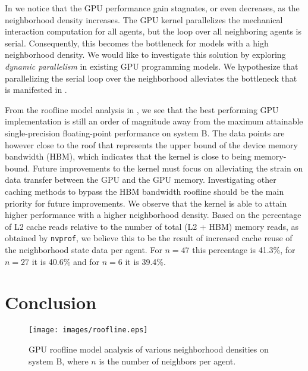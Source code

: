 \documentclass[conference]{IEEEtran}
\begin{document}
\par In  we notice that the GPU performance gain stagnates, or even decreases, as the neighborhood density increases.
The GPU kernel parallelizes the mechanical interaction computation for all agents, but the loop over all neighboring agents is serial.
Consequently, this becomes the bottleneck for models with a high neighborhood density.
We would like to investigate this solution by exploring \textit{dynamic parallelism} \cite{jones2012introduction} in existing GPU programming models.
We hypothesize that parallelizing the serial loop over the neighborhood alleviates the bottleneck that is manifested in .
\par From the roofline model analysis in , we see that the best performing GPU implementation is still an order of magnitude away from the maximum attainable single-precision floating-point performance on system B.
The data points are however close to the roof that represents the upper bound of the device memory bandwidth (HBM), which indicates that the kernel is close to being memory-bound.
Future improvements to the kernel must focus on alleviating the strain on data transfer between the GPU and the GPU memory.
Investigating other caching methods to bypass the HBM bandwidth roofline should be the main priority for future improvements.
We observe that the kernel is able to attain higher performance with a higher neighborhood density.
Based on the percentage of L2 cache reads relative to the number of total (L2 + HBM) memory reads, as obtained by \texttt{nvprof}, we believe this to be the result of increased cache reuse of the neighborhood state data per agent.
For $n = 47$ this percentage is 41.3\%, for $n = 27$ it is 40.6\% and for $n = 6$ it is 39.4\%.

\section{Conclusion} \label{sec:conclusions}

\begin{figure}[!t]
    \centering
    \texttt{[image: images/roofline.eps]}
    \caption{GPU roofline model analysis of various neighborhood densities on system B, where $n$ is the number of neighbors per agent.}
    \label{fig:roofline}
\end{figure}
\end{document}
